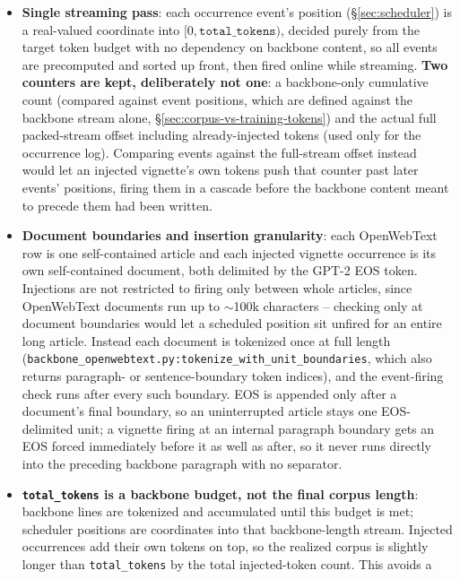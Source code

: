 \documentclass[11pt]{article}
\begin{document}
\begin{itemize}
  \item \textbf{Single streaming pass}: each occurrence event's position
    (\S\ref{sec:scheduler}) is a real-valued coordinate into
    $[0, \texttt{total\_tokens})$, decided purely from the target token
    budget with no dependency on backbone content, so all events are
    precomputed and sorted up front, then fired online while streaming.
    \textbf{Two counters are kept, deliberately not one}: a backbone-only
    cumulative count (compared against event positions, which are defined
    against the backbone stream alone,
    \S\ref{sec:corpus-vs-training-tokens}) and the actual full
    packed-stream offset including already-injected tokens (used only for
    the occurrence log). Comparing events against the full-stream offset
    instead would let an injected vignette's own tokens push that counter
    past later events' positions, firing them in a cascade before the
    backbone content meant to precede them had been written.
  \item \textbf{Document boundaries and insertion granularity}: each
    OpenWebText row is one self-contained article and each injected
    vignette occurrence is its own self-contained document, both delimited
    by the GPT-2 EOS token. Injections are not restricted to firing only
    between whole articles, since OpenWebText documents run up to
    $\sim$100k characters -- checking only at document boundaries would let
    a scheduled position sit unfired for an entire long article. Instead
    each document is tokenized once at full length
    (\texttt{backbone\_openwebtext.py:tokenize\_with\_unit\_boundaries},
    which also returns paragraph- or sentence-boundary token indices), and
    the event-firing check runs after every such boundary. EOS is appended
    only after a document's final boundary, so an uninterrupted article
    stays one EOS-delimited unit; a vignette firing at an internal paragraph
    boundary gets an EOS forced immediately before it as well as after, so
    it never runs directly into the preceding backbone paragraph with no
    separator.
  \item \textbf{\texttt{total\_tokens} is a backbone budget, not the final
    corpus length}: backbone lines are tokenized and accumulated until this
    budget is met; scheduler positions are coordinates into that
    backbone-length stream. Injected occurrences add their own tokens on
    top, so the realized corpus is slightly longer than
    \texttt{total\_tokens} by the total injected-token count. This avoids a

\end{itemize}
\end{document}
